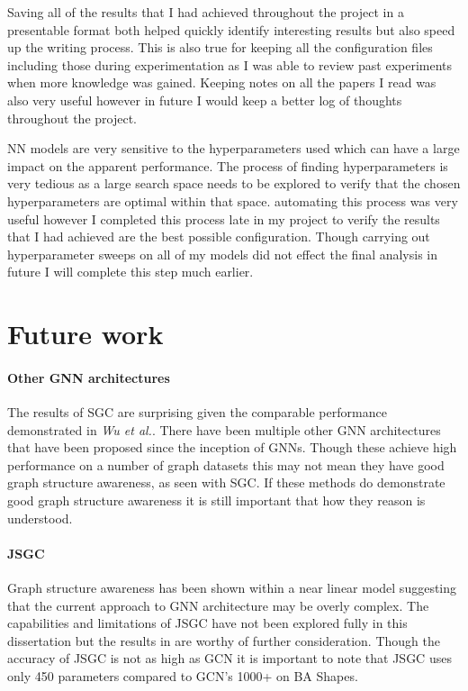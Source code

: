 Saving all of the results that I had achieved throughout the project in a presentable format both helped quickly identify interesting results but also speed up the writing process.
This is also true for keeping all the configuration files including those during experimentation as I was able to review past experiments when more knowledge was gained.
Keeping notes on all the papers I read was also very useful however in future I would keep a better log of thoughts throughout the project.

NN models are very sensitive to the hyperparameters used which can have a large impact on the apparent performance.
The process of finding hyperparameters is very tedious as a large search space needs to be explored to verify that the chosen hyperparameters are optimal within that space.
automating this process was very useful however I completed this process late in my project to verify the results that I had achieved are the best possible configuration.
Though carrying out hyperparameter sweeps on all of my models did not effect the final analysis in future I will complete this step much earlier.

\section{Future work}
\paragraph{Other GNN architectures}
The results of SGC are surprising given the comparable performance demonstrated in \textit{Wu et al.}\cite{wu2019simplifying}.
There have been multiple other GNN architectures that have been proposed since the inception of GNNs.
Though these achieve high performance on a number of graph datasets this may not mean they have good graph structure awareness, as seen with SGC.
If these methods do demonstrate good graph structure awareness it is still important that how they reason is understood.

\paragraph{JSGC}
Graph structure awareness has been shown within a near linear model suggesting that the current approach to GNN architecture may be overly complex.
The capabilities and limitations of JSGC have not been explored fully in this dissertation but the results in  are worthy of further consideration.
Though the accuracy of JSGC is not as high as GCN it is important to note that JSGC uses only 450 parameters compared to GCN's 1000+ on BA Shapes.

